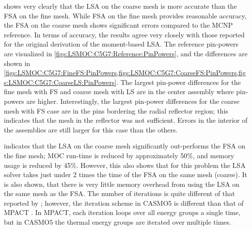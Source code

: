 {{{       shows very clearly that the \ac{LSA} on the coarse mesh is more accurate than the \ac{FSA} on the fine mesh.
      While \ac{FSA} on the fine mesh provides reasonable accuracy, the \ac{FSA} on the coarse mesh shows significant errors compared to the MCNP reference.
      In terms of accuracy, the results agree very closely with those reported for the original derivation of the moment-based \ac{LSA}.
      The reference pin-powers are visualized in \cref{figs:LSMOC:C5G7:Reference:PinPowers}, and the differences are shown in \cref{figs:LSMOC:C5G7:FineFS:PinPowers,figs:LSMOC:C5G7:CoarseFS:PinPowers,figs:LSMOC:C5G7:CoarseLS:PinPowers}.
      The largest pin-power differences for the fine mesh with \ac{FS} and coarse mesh with \ac{LS} are in the center assembly where pin-powers are higher.
      Interestingly, the largest pin-power differences for the coarse mesh with \ac{FS} case are in the pins bordering the radial reflector region;
        this indicates that the mesh in the reflector was not sufficient.
      Errors in the interior of the assemblies are still larger for this case than the others.

       indicates that the \ac{LSA} on the coarse mesh significantly out-performs the \ac{FSA} on the fine mesh;
      \ac{MOC} run-time is reduced by approximately 50\%, and memory usage is reduced by 45\%.
      However, this also shows that for this problem the \ac{LSA} solver takes just under 2 times the time of the \ac{FSA} on the same mesh (coarse).
      It is also shown, that there is very little memory overhead from using the \ac{LSA} on the same mesh as the \ac{FSA}.
      The number of iterations is quite different of that reported by \citet{Ferrer2016}; however, the iteration scheme in CASMO5 is different than that of MPACT \cite{FerrerPersoanlCommunications2018}.
      In MPACT, each iteration loops over all energy groups a single time, but in CASMO5 the thermal energy groups are iterated over multiple times.

}}}
